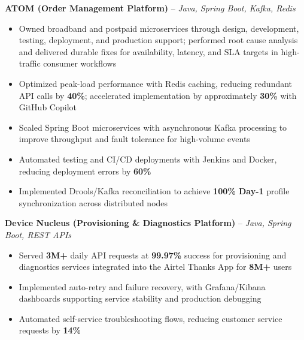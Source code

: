 \documentclass[letterpaper,11pt]{article}
\newcommand{\resumeItem}[1]{
  \item\small{{#1 \vspace{-2pt}}}
}
\newcommand{\resumeItemListStart}{\begin{itemize}}
\newcommand{\resumeItemListEnd}{\end{itemize}\vspace{-5pt}}
\begin{document}
      \vspace{4pt}
      \textbf{\small ATOM (Order Management Platform)} -- \textit{\small Java, Spring Boot, Kafka, Redis} \\
      \vspace{-2pt}
      \resumeItemListStart
        \resumeItem{Owned broadband and postpaid microservices through design, development, testing, deployment, and production support; performed root cause analysis and delivered durable fixes for availability, latency, and SLA targets in high-traffic consumer workflows} %
        \resumeItem{Optimized peak-load performance with Redis caching, reducing redundant API calls by \textbf{40\%}; accelerated implementation by approximately \textbf{30\%} with GitHub Copilot}
        \resumeItem{Scaled Spring Boot microservices with asynchronous Kafka processing to improve throughput and fault tolerance for high-volume events}
        \resumeItem{Automated testing and CI/CD deployments with Jenkins and Docker, reducing deployment errors by \textbf{60\%}} %
        \resumeItem{Implemented Drools/Kafka reconciliation to achieve \textbf{100\% Day-1} profile synchronization across distributed nodes}
      \resumeItemListEnd

      \vspace{4pt}
      \textbf{\small Device Nucleus (Provisioning \& Diagnostics Platform)} -- \textit{\small Java, Spring Boot, REST APIs} \\
      \vspace{-2pt}
      \resumeItemListStart
        \resumeItem{Served \textbf{3M+} daily API requests at \textbf{99.97\%} success for provisioning and diagnostics services integrated into the Airtel Thanks App for \textbf{8M+} users}
        \resumeItem{Implemented auto-retry and failure recovery, with Grafana/Kibana dashboards supporting service stability and production debugging}
        \resumeItem{Automated self-service troubleshooting flows, reducing customer service requests by \textbf{14\%}}
      \resumeItemListEnd
\end{document}

